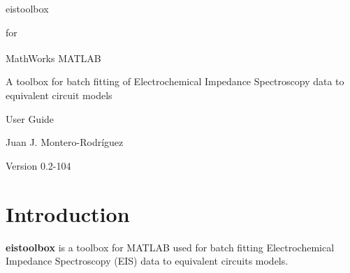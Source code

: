 \documentclass[9pt,a4paper,oneside]{book}
\begin{document}
\setlength{\parindent}{0pt}
\setlength{\parskip}{6pt}


\frontmatter

\begin{titlepage}

\vspace*{3cm}

\begin{center}
	\Huge eistoolbox \par
\end{center}
\begin{center}
	\LARGE for \par
\end{center}
\begin{center}
	\Huge MathWorks\textsuperscript{\textregistered} MATLAB \par
\end{center}

\vspace*{2cm}

\begin{center}
	\Large A toolbox for batch fitting of Electrochemical Impedance Spectroscopy data to equivalent circuit models
\end{center} 

\vspace*{2cm}

\begin{center}
	\Huge User Guide \par
\end{center}
\begin{center}
	\LARGE Juan J. Montero-Rodríguez \par
\end{center}

\vspace*{4cm}

\begin{center}
	\Large Version 0.2-104
\end{center}

\end{titlepage}

\clearpage

\tableofcontents


\mainmatter
\pagestyle{mmatter}

\chapter{Introduction}

\textbf{eistoolbox} is a toolbox for MATLAB\textregistered{} used for batch fitting Electrochemical Impedance Spectroscopy (EIS) data to equivalent circuits models.
\end{document}
